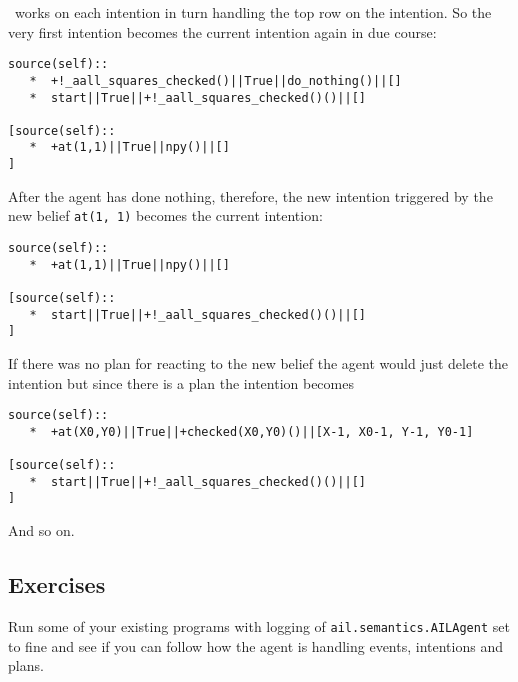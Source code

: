 \gwendolen\ works on each intention in turn handling the top row on the intention.  So the very first intention becomes the current intention again in due course:
\begin{verbatim}
source(self):: 
   *  +!_aall_squares_checked()||True||do_nothing()||[]
   *  start||True||+!_aall_squares_checked()()||[]

[source(self):: 
   *  +at(1,1)||True||npy()||[]
] 
\end{verbatim}

After the agent has done nothing, therefore, the new intention triggered by the new belief \texttt{at(1, 1)} becomes the current intention:
\begin{verbatim}
source(self):: 
   *  +at(1,1)||True||npy()||[]

[source(self):: 
   *  start||True||+!_aall_squares_checked()()||[]
] 
\end{verbatim}

If there was no plan for reacting to the new belief the agent would just delete the intention but since there is a plan the intention becomes
\begin{verbatim}
source(self):: 
   *  +at(X0,Y0)||True||+checked(X0,Y0)()||[X-1, X0-1, Y-1, Y0-1]

[source(self):: 
   *  start||True||+!_aall_squares_checked()()||[]
] 
\end{verbatim}
And so on.

\subsection{Exercises}
Run some of your existing programs with logging of \texttt{ail.semantics.AILAgent} set to fine and see if you can follow how the agent is handling events, intentions and plans.

